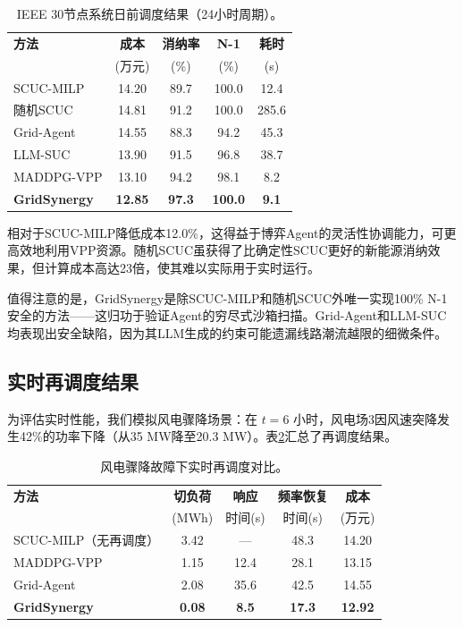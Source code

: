 \documentclass[conference]{IEEEtran}
\begin{document}
\begin{table}[t]
\centering
\caption{IEEE 30节点系统日前调度结果（24小时周期）。}
\label{tab:day_ahead}
\begin{tabular}{lcccc}
\toprule
\textbf{方法} & \textbf{成本} & \textbf{消纳率} & \textbf{N-1} & \textbf{耗时} \\
 & (万元) & (\%) & (\%) & (s) \\
\midrule
SCUC-MILP          & 14.20 & 89.7 & 100.0 & 12.4 \\
随机SCUC           & 14.81 & 91.2 & 100.0 & 285.6 \\
Grid-Agent         & 14.55 & 88.3 & 94.2  & 45.3 \\
LLM-SUC            & 13.90 & 91.5 & 96.8  & 38.7 \\
MADDPG-VPP         & 13.10 & 94.2 & 98.1  & 8.2  \\
\textbf{GridSynergy} & \textbf{12.85} & \textbf{97.3} & \textbf{100.0} & \textbf{9.1} \\
\bottomrule
\end{tabular}
\end{table}

相对于SCUC-MILP降低成本12.0\%，这得益于博弈Agent的灵活性协调能力，可更高效地利用VPP资源。随机SCUC虽获得了比确定性SCUC更好的新能源消纳效果，但计算成本高达23倍，使其难以实际用于实时运行。

值得注意的是，GridSynergy是除SCUC-MILP和随机SCUC外唯一实现100\% N-1安全的方法——这归功于验证Agent的穷尽式沙箱扫描。Grid-Agent和LLM-SUC均表现出安全缺陷，因为其LLM生成的约束可能遗漏线路潮流越限的细微条件。

\subsection{实时再调度结果}

为评估实时性能，我们模拟风电骤降场景：在 $t = 6$ 小时，风电场3因风速突降发生42\%的功率下降（从35 MW降至20.3 MW）。表\ref{tab:realtime}汇总了再调度结果。

\begin{table}[t]
\centering
\caption{风电骤降故障下实时再调度对比。}
\label{tab:realtime}
\begin{tabular}{lcccc}
\toprule
\textbf{方法} & \textbf{切负荷} & \textbf{响应} & \textbf{频率恢复} & \textbf{成本} \\
 & (MWh) & 时间(s) & 时间(s) & (万元) \\
\midrule
SCUC-MILP（无再调度） & 3.42 & --- & 48.3 & 14.20 \\
MADDPG-VPP           & 1.15 & 12.4 & 28.1 & 13.15 \\
Grid-Agent           & 2.08 & 35.6 & 42.5 & 14.55 \\
\textbf{GridSynergy}  & \textbf{0.08} & \textbf{8.5} & \textbf{17.3} & \textbf{12.92} \\
\bottomrule
\end{tabular}
\end{table}
\end{document}
